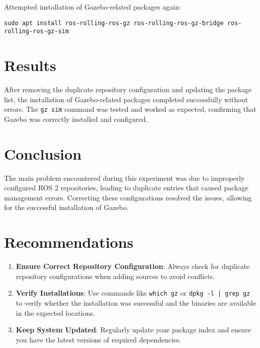 \documentclass{article}
\begin{document}
Attempted installation of Gazebo-related packages again:
\begin{verbatim}
sudo apt install ros-rolling-ros-gz ros-rolling-ros-gz-bridge ros-rolling-ros-gz-sim
\end{verbatim}

\section*{Results}
After removing the duplicate repository configuration and updating the package list, the installation of Gazebo-related packages completed successfully without errors. The \texttt{gz sim} command was tested and worked as expected, confirming that Gazebo was correctly installed and configured.

\section*{Conclusion}
The main problem encountered during this experiment was due to improperly configured ROS 2 repositories, leading to duplicate entries that caused package management errors. Correcting these configurations resolved the issues, allowing for the successful installation of Gazebo.

\section*{Recommendations}
\begin{enumerate}
    \item \textbf{Ensure Correct Repository Configuration}: Always check for duplicate repository configurations when adding sources to avoid conflicts.
    \item \textbf{Verify Installations}: Use commands like \texttt{which gz} or \texttt{dpkg -l | grep gz} to verify whether the installation was successful and the binaries are available in the expected locations.
    \item \textbf{Keep System Updated}: Regularly update your package index and ensure you have the latest versions of required dependencies.
\end{enumerate}
\end{document}
